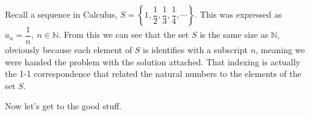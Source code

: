 \begin{example}[$a_n$]
Recall a sequence in Calculus, $S = \left\{1, \dfrac 12, \dfrac 13, \dfrac 14,\cdots \right\}$.  This was expressed as $a_n = \dfrac 1n, ~ n\in \mathbb{N}$.  From this we can see that the set $S$ is the same size as $\mathbb{N}$, obviously because each element of $S$ is identifies with a subscript $n$, meaning we were handed the problem with the solution attached.  That indexing is actually the 1-1 correspondence that related the natural numbers to the elements of the set $S$. 
\end{example}

Now let's get to the good stuff.  
